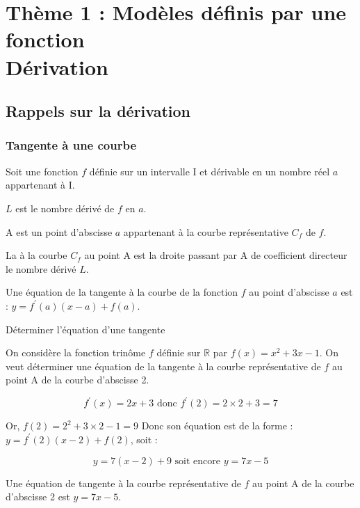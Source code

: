\chapter[Thème 1 $-$ Dérivation]{Thème 1 : Modèles définis par une fonction \\Dérivation}
\thispagestyle{fancy}

\section{Rappels sur la dérivation}

\subsection{Tangente à une courbe}

Soit une fonction $f$ définie sur un intervalle I et dérivable en un nombre réel $a$ appartenant à I.

$L$ est le nombre dérivé de $f$ en $a$.

A est un point d'abscisse $a$ appartenant à la courbe représentative $C_f$ de $f$.



    \begin{bdefi}
        La  à la courbe $C_f$ au point A est la droite passant par A de coefficient directeur le nombre dérivé $L$.
    \end{bdefi}
    
    \begin{bprop}
    	Une équation de la tangente à la courbe de la fonction $f$ au point d'abscisse $a$ est : $y=f^{\prime}(a)(x-a)+f(a)$.
    \end{bprop}
    
    \begin{bmethodet}{Déterminer l'équation d'une tangente}
    	
    	On considère la fonction trinôme $f$ définie sur $\mathbb{R}$ par $f(x)=x^2+3 x-1$.
    	On veut déterminer une équation de la tangente à la courbe représentative de $f$ au point A de la courbe d'abscisse 2.
    	
    	$$
    	f^{\prime}(x)=2 x+3 \text { donc } f^{\prime}(2)=2 \times 2+3=7
    	$$
    	
    	
    	Or, $f(2)=2^2+3 \times 2-1=9$
    	Donc son équation est de la forme : $y=f^{\prime}(2)(x-2)+f(2)$, soit :
    	
    	$$
    	y=7(x-2)+9 \text { soit encore } y=7 x-5
    	$$
    	
    	Une équation de tangente à la courbe représentative de $f$ au point A de la courbe d'abscisse 2 est $y=7 x-5$.
    \end{bmethodet}
    
